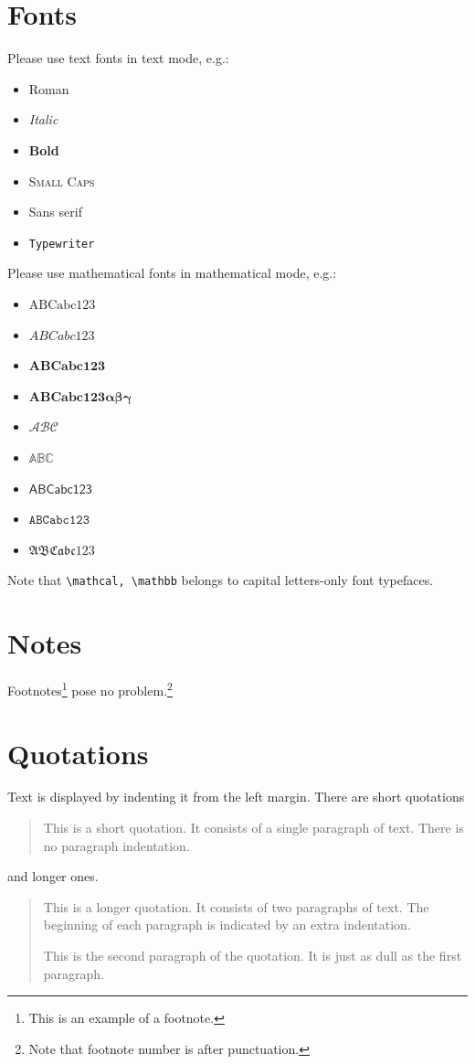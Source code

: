 \documentclass[aoas]{imsart}
\theoremstyle{plain}
\theoremstyle{definition}
\begin{document}
\section{Fonts}
Please use text fonts in text mode, e.g.:
\begin{itemize}
\item[]\textrm{Roman}
\item[]\textit{Italic}
\item[]\textbf{Bold}
\item[]\textsc{Small Caps}
\item[]\textsf{Sans serif}
\item[]\texttt{Typewriter}
\end{itemize}
Please use mathematical fonts in mathematical mode, e.g.:
\begin{itemize}
\item[] $\mathrm{ABCabc123}$
\item[] $\mathit{ABCabc123}$
\item[] $\mathbf{ABCabc123}$
\item[] $\boldsymbol{ABCabc123\alpha\beta\gamma}$
\item[] $\mathcal{ABC}$
\item[] $\mathbb{ABC}$
\item[] $\mathsf{ABCabc123}$
\item[] $\mathtt{ABCabc123}$
\item[] $\mathfrak{ABCabc123}$
\end{itemize}
Note that \verb|\mathcal, \mathbb| belongs to capital letters-only font typefaces.

\section{Notes}
Footnotes\footnote{This is an example of a footnote.}
pose no problem.\footnote{Note that footnote number is after punctuation.}

\section{Quotations}

Text is displayed by indenting it from the left margin. There are short quotations
\begin{quote}
This is a short quotation.  It consists of a
single paragraph of text.  There is no paragraph
indentation.
\end{quote}
and longer ones.
\begin{quotation}
This is a longer quotation.  It consists of two paragraphs
of text.  The beginning of each paragraph is indicated
by an extra indentation.

This is the second paragraph of the quotation.  It is just
as dull as the first paragraph.
\end{quotation}
\end{document}
